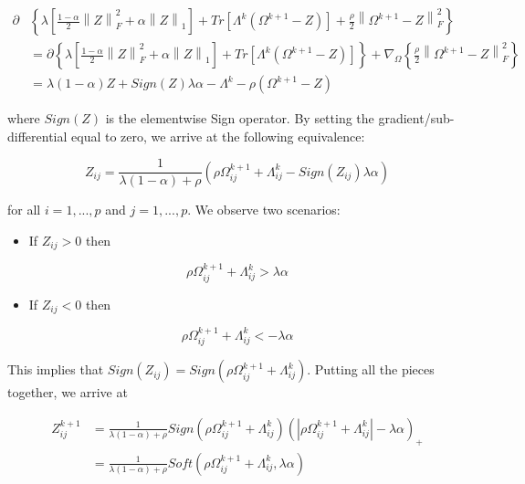 \documentclass[12pt,]{book}
\providecommand{\tightlist}{%
  \setlength{\itemsep}{0pt}\setlength{\parskip}{0pt}}
\theoremstyle{definition}
\theoremstyle{definition}
\theoremstyle{definition}
\theoremstyle{remark}
\begin{document}
\begin{align*}
  \partial&\left\{ \lambda\left[ \frac{1 - \alpha}{2}\left\| Z \right\|_{F}^{2} + \alpha\left\| Z \right\|_{1} \right] + Tr\left[\Lambda^{k}\left(\Omega^{k + 1} - Z\right)\right] + \frac{\rho}{2}\left\| \Omega^{k + 1} - Z \right\|_{F}^{2} \right\} \\
  &= \partial\left\{ \lambda\left[ \frac{1 - \alpha}{2}\left\| Z \right\|_{F}^{2} + \alpha\left\| Z \right\|_{1} \right] + Tr\left[\Lambda^{k}\left(\Omega^{k + 1} - Z\right)\right]\right\} + \nabla_{\Omega}\left\{\frac{\rho}{2}\left\| \Omega^{k + 1} - Z \right\|_{F}^{2} \right\} \\
  &= \lambda(1 - \alpha)Z + Sign(Z)\lambda\alpha - \Lambda^{k} - \rho\left( \Omega^{k + 1} - Z \right)
\end{align*}

where \(Sign(Z)\) is the elementwise Sign operator. By setting the
gradient/sub-differential equal to zero, we arrive at the following
equivalence:

\[ Z_{ij} = \frac{1}{\lambda(1 - \alpha) + \rho}\left( \rho \Omega_{ij}^{k + 1} + \Lambda_{ij}^{k} - Sign(Z_{ij})\lambda\alpha \right) \]

for all \(i = 1,..., p\) and \(j = 1,..., p\). We observe two scenarios:

\begin{itemize}
\tightlist
\item
  If \(Z_{ij} > 0\) then
\end{itemize}

\[ \rho\Omega_{ij}^{k + 1} + \Lambda_{ij}^{k} > \lambda\alpha \]

\begin{itemize}
\tightlist
\item
  If \(Z_{ij} < 0\) then
\end{itemize}

\[ \rho\Omega_{ij}^{k + 1} + \Lambda_{ij}^{k} < -\lambda\alpha \]

This implies that
\(Sign(Z_{ij}) = Sign(\rho\Omega_{ij}^{k + 1} + \Lambda_{ij}^{k})\).
Putting all the pieces together, we arrive at

\begin{align*}
Z_{ij}^{k + 1} &= \frac{1}{\lambda(1 - \alpha) + \rho}Sign\left(\rho\Omega_{ij}^{k + 1} + \Lambda_{ij}^{k}\right)\left( \left| \rho\Omega_{ij}^{k + 1} + \Lambda_{ij}^{k} \right| - \lambda\alpha \right)_{+} \\
&= \frac{1}{\lambda(1 - \alpha) + \rho}Soft\left(\rho\Omega_{ij}^{k + 1} + \Lambda_{ij}^{k}, \lambda\alpha\right)
\end{align*}
\end{document}
